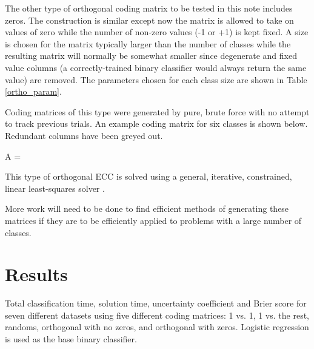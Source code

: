 The other type of orthogonal coding matrix to be tested in this note
includes zeros.
The construction is similar except now the matrix is allowed to take on values
of zero while the number of non-zero values (-1 or +1) is kept fixed.
A size is chosen for the matrix typically larger than the number of
classes while the resulting matrix will normally be somewhat smaller since
degenerate and fixed value columns (a correctly-trained binary classifier would always return the same value) are removed.
The parameters chosen for each class size are shown in Table
\ref{ortho_param}.

Coding matrices of this type were generated by pure, brute force with no
attempt to track previous trials.
An example coding matrix for six classes is shown below.
Redundant columns have been greyed out.
\begin{eqnnon}
	A = 
\end{eqnnon}
This type of orthogonal ECC is solved using a general, iterative,
constrained, linear least-squares solver \citep{Lawson_Hanson1995}.

More work will need to be done to find efficient methods
of generating these matrices
if they are to be efficiently applied to problems with a large number of classes.


\section{Results}

\begin{table*}
\caption{Total classification time, solution time, uncertainty coefficient and Brier score for seven different datasets using five different coding matrices: 1 vs. 1, 1 vs. the rest, randoms, orthogonal with no zeros, and orthogonal with zeros. Logistic regression is used as the base binary classifier.}\label{class_results_lin}

\end{table*}

